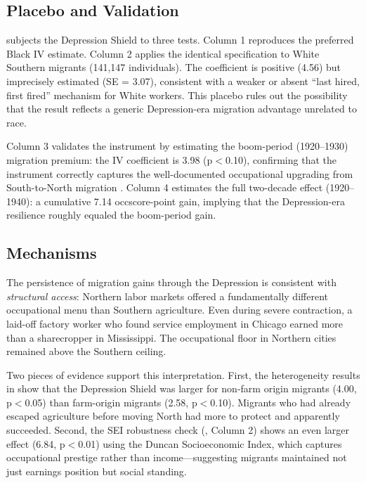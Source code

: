\documentclass[12pt]{article}
\begin{document}


\subsection{Placebo and Validation}

 subjects the Depression Shield to three tests. Column 1 reproduces the preferred Black IV estimate. Column 2 applies the identical specification to White Southern migrants (141,147 individuals). The coefficient is positive (4.56) but imprecisely estimated (SE = 3.07), consistent with a weaker or absent ``last hired, first fired'' mechanism for White workers. This placebo rules out the possibility that the result reflects a generic Depression-era migration advantage unrelated to race.

Column 3 validates the instrument by estimating the boom-period (1920--1930) migration premium: the IV coefficient is 3.98 (p$<$0.10), confirming that the instrument correctly captures the well-documented occupational upgrading from South-to-North migration \citep{collins2014}. Column 4 estimates the full two-decade effect (1920--1940): a cumulative 7.14 occscore-point gain, implying that the Depression-era resilience roughly equaled the boom-period gain.



\subsection{Mechanisms}

The persistence of migration gains through the Depression is consistent with \textit{structural access}: Northern labor markets offered a fundamentally different occupational menu than Southern agriculture. Even during severe contraction, a laid-off factory worker who found service employment in Chicago earned more than a sharecropper in Mississippi. The occupational floor in Northern cities remained above the Southern ceiling.

Two pieces of evidence support this interpretation. First, the heterogeneity results in  show that the Depression Shield was larger for non-farm origin migrants (4.00, p$<$0.05) than farm-origin migrants (2.58, p$<$0.10). Migrants who had already escaped agriculture before moving North had more to protect and apparently succeeded. Second, the SEI robustness check (, Column 2) shows an even larger effect (6.84, p$<$0.01) using the Duncan Socioeconomic Index, which captures occupational prestige rather than income---suggesting migrants maintained not just earnings position but social standing.
\end{document}

